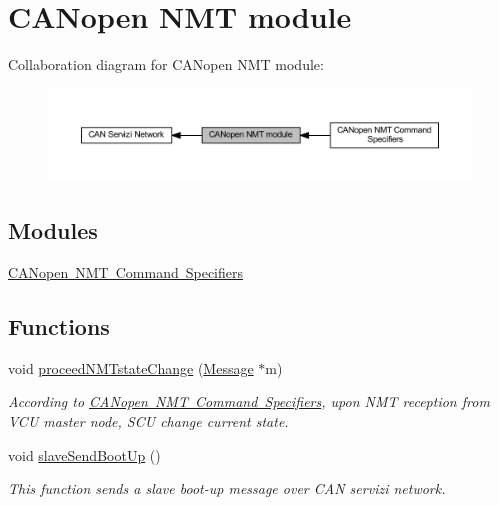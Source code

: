 \hypertarget{group___c_a_nopen___n_m_t__group}{}\section{C\+A\+Nopen N\+MT module}
\label{group___c_a_nopen___n_m_t__group}
Collaboration diagram for C\+A\+Nopen N\+MT module\+:\nopagebreak
\begin{figure}[H]
\begin{center}
\leavevmode
\includegraphics[width=350pt]{group___c_a_nopen___n_m_t__group}
\end{center}
\end{figure}
\subsection*{Modules}
\begin{DoxyCompactItemize}
\item 
\mbox{\hyperlink{group___c_a_nopen___n_m_t__speficications}{C\+A\+Nopen N\+M\+T Command Specifiers}}
\end{DoxyCompactItemize}
\subsection*{Functions}
\begin{DoxyCompactItemize}
\item 
void \mbox{\hyperlink{group___c_a_nopen___n_m_t__group_ga4f3ea874d17be7eefe09f3d8fcd9fc76}{proceed\+N\+M\+Tstate\+Change}} (\mbox{\hyperlink{struct_message}{Message}} $\ast$m)
\begin{DoxyCompactList}\small\item\em According to \mbox{\hyperlink{group___c_a_nopen___n_m_t__speficications}{C\+A\+Nopen N\+MT Command Specifiers}}, upon N\+MT reception from V\+CU master node, S\+CU change current state. \end{DoxyCompactList}\item 
void \mbox{\hyperlink{group___c_a_nopen___n_m_t__group_ga26588b389853484f581977032c0e1021}{slave\+Send\+Boot\+Up}} ()
\begin{DoxyCompactList}\small\item\em This function sends a slave boot-\/up message over C\+AN servizi network. \end{DoxyCompactList}\end{DoxyCompactItemize}


